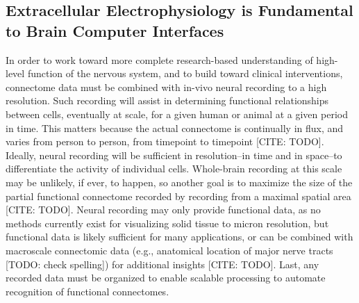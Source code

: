 \documentclass[11pt]{article}
\newcommand{\subsectionwithindent}[1]{
    \subsection*{#1}
    \hspace{\parindent} %
}
\begin{document}
\subsectionwithindent{Extracellular Electrophysiology is Fundamental to Brain Computer Interfaces} %
In order to work toward more complete research-based understanding of high-level function of the nervous system, and to build toward clinical interventions, connectome data must be combined with in-vivo neural recording to a high resolution. Such recording will assist in determining functional relationships between cells, eventually at scale, for a given human or animal at a given period in time. This matters because the actual connectome is continually in flux, and varies from person to person, from timepoint to timepoint [CITE: TODO]. Ideally, neural recording will be sufficient in resolution--in time and in space--to differentiate the activity of individual cells. Whole-brain recording at this scale may be unlikely, if ever, to happen, so another goal is to maximize the size of the partial functional connectome recorded by recording from a maximal spatial area  [CITE: TODO]. Neural recording may only provide functional data, as no methods currently exist for visualizing solid tissue to micron resolution, but functional data is likely sufficient for many applications, or can be combined with macroscale connectomic data (e.g., anatomical location of major nerve tracts [TODO: check spelling]) for additional insights  [CITE: TODO]. Last, any recorded data must be organized to enable scalable processing to automate recognition of functional connectomes.


\end{document}
